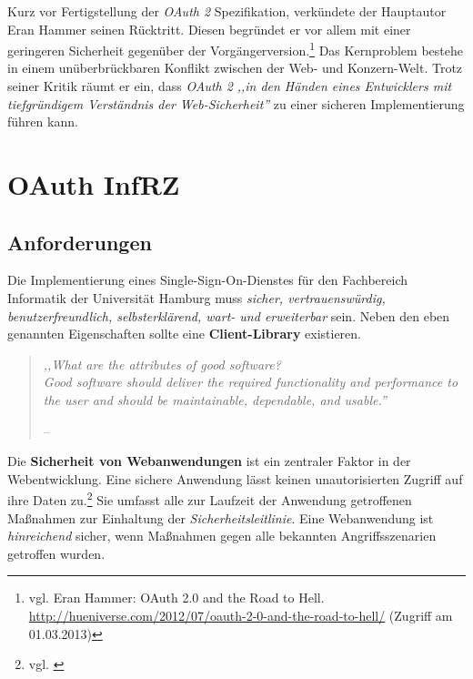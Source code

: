 \documentclass[12pt,a4paper,pointednumbers,abstracton]{scrartcl}
\begin{document}
Kurz vor Fertigstellung der \emph{OAuth 2} Spezifikation, verkündete der Hauptautor Eran Hammer seinen Rücktritt.
Diesen begründet er vor allem mit einer geringeren Sicherheit gegenüber der Vorgängerversion.\footnote{vgl. Eran Hammer: OAuth 2.0 and the Road to Hell. \url{http://hueniverse.com/2012/07/oauth-2-0-and-the-road-to-hell/} (Zugriff am 01.03.2013)}
Das Kernproblem bestehe in einem unüberbrückbaren Konflikt zwischen der Web- und Konzern-Welt.
Trotz seiner Kritik räumt er ein, dass \emph{OAuth 2} \emph{,,in den Händen eines Entwicklers mit tiefgründigem Verständnis der Web-Sicherheit''} zu einer sicheren Implementierung führen kann.


\newpage
\section{OAuth InfRZ}
\label{sec:oauth-infrz}

\subsection{Anforderungen}
\label{sec:oauth-infrz/requirements}

Die Implementierung eines Single-Sign-On-Dienstes für den Fachbereich Informatik der Universität Hamburg muss \emph{sicher, vertrauenswürdig, benutzerfreundlich, selbsterklärend, wart- und erweiterbar} sein.
Neben den eben genannten Eigenschaften sollte eine \textbf{Client-Library} existieren.

\begin{quote}
\emph{,,What are the attributes of good software?\\
Good software should deliver the required functionality and performance to the user and should be maintainable, dependable, and usable.''}
\begin{flushright}
\small{-- \cite[Section 1.1]{Som10}}
\end{flushright}
\end{quote}

Die \textbf{Sicherheit von Webanwendungen} ist ein zentraler Faktor in der Webentwicklung.
Eine sichere Anwendung lässt keinen unautorisierten Zugriff auf ihre Daten zu.\footnote{vgl. \cite[Section 10.1.1]{Som10}}
Sie umfasst alle zur Laufzeit der Anwendung getroffenen Maßnahmen zur Einhaltung der \emph{Sicherheitsleitlinie}.
Eine Webanwendung ist \emph{hinreichend} sicher, wenn Maßnahmen gegen alle bekannten Angriffsszenarien getroffen wurden.
\end{document}
